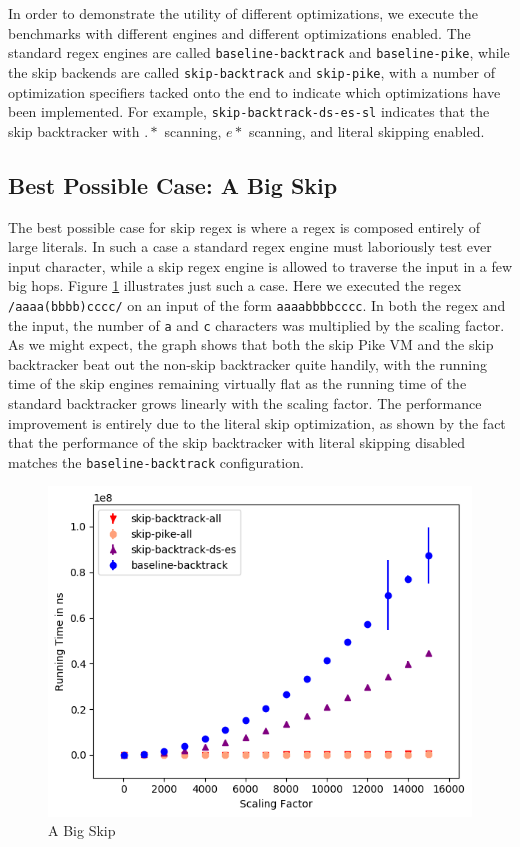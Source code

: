 In order to demonstrate the utility of different optimizations,
we execute the benchmarks with different engines and different
optimizations enabled. The standard regex engines are called
\verb'baseline-backtrack' and \verb'baseline-pike', while the
skip backends are called \verb'skip-backtrack' and \verb'skip-pike',
with a number of optimization specifiers tacked onto the end to
indicate which optimizations have been implemented. For example,
\verb'skip-backtrack-ds-es-sl' indicates that the skip backtracker
with $.*$ scanning, $e*$ scanning, and literal skipping enabled.


\subsection{Best Possible Case: A Big Skip}

The best possible case for skip regex is where a regex is composed
entirely of large literals. In such a case a standard regex engine
must laboriously test ever input character, while a skip regex
engine is allowed to traverse the input in a few big hops. Figure
\ref{fig:a:big:skip} illustrates just such a case. Here we executed the
regex \verb'/aaaa(bbbb)cccc/' on an input of the form \verb'aaaabbbbcccc'.
In both the regex and the input, the number of \verb'a' and \verb'c'
characters was multiplied by the scaling factor. As we might expect,
the graph shows that both the skip Pike VM and the skip backtracker
beat out the non-skip backtracker quite handily, with the running time
of the skip engines remaining virtually flat as the running
time of the standard backtracker grows linearly with the scaling factor.
The performance improvement is entirely due to the literal skip
optimization, as shown by the fact that the performance of the skip
backtracker with literal skipping disabled matches the
\verb'baseline-backtrack' configuration.

\begin{figure}
\label{fig:a:big:skip}
\caption{A Big Skip}
\includegraphics{resources/a-big-skip.png}
\end{figure}

